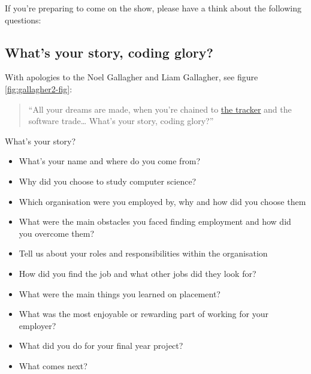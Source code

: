 \documentclass[
]{book}
\providecommand{\tightlist}{%
  \setlength{\itemsep}{0pt}\setlength{\parskip}{0pt}}
\begin{document}
If you're preparing to come on the show, please have a think about the following questions:

\hypertarget{your-story}{%
\subsection{What's your story, coding glory?}\label{your-story}}

With apologies to the Noel Gallagher and Liam Gallagher, see figure \ref{fig:gallagher2-fig}:

\begin{quote}
``All your dreams are made, when you're chained to \href{https://en.wikipedia.org/wiki/Comparison_of_issue-tracking_systems}{the tracker} and the software trade\ldots{}
What's your story, coding glory?''
\end{quote}

What's your story?

\begin{itemize}
\tightlist
\item
  What's your name and where do you come from? \citep{blinddate}
\item
  Why did you choose to study computer science?
\item
  Which organisation were you employed by, why and how did you choose them
\item
  What were the main obstacles you faced finding employment and how did you overcome them?
\item
  Tell us about your roles and responsibilities within the organisation
\item
  How did you find the job and what other jobs did they look for?
\item
  What were the main things you learned on placement?
\item
  What was the most enjoyable or rewarding part of working for your employer?
\item
  What did you do for your final year project?
\item
  What comes next?
\end{itemize}
\end{document}
